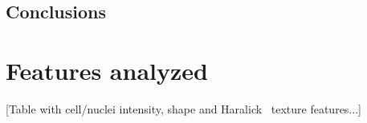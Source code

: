 \documentclass[oneside, a4paper, draft]{memoir} %
\begin{document}
\section{Conclusions}
\textcolor{gray}{\lipsum[3]}


\nocite{duda2001pattern}


\appendix
\chapter{Features analyzed}\label{app:featurelist}
[Table with cell/nuclei intensity, shape and Haralick~\cite{haralick1973textural} texture features...]
\end{document}
